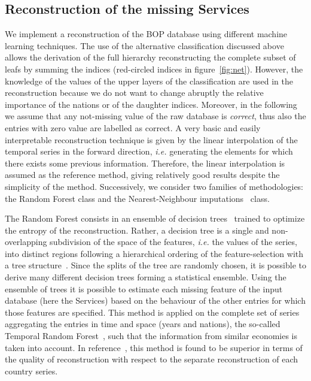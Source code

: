 \documentclass[fleqn,10pt]{article}
\begin{document}
\subsection*{Reconstruction of the missing Services}

We implement a reconstruction of the BOP database using different machine learning techniques.
The use of the alternative classification discussed above allows the derivation of the full hierarchy reconstructing the complete subset of leafs by summing the indices (red-circled indices in figure~\ref{fig:net}).
However, the knowledge of the values of the upper layers of the classification are used in the reconstruction because we do not want to change abruptly the relative importance of the nations or of the daughter indices.
Moreover, in the following we assume that any not-missing value of the raw database is \textit{correct}, thus also the entries with zero value are labelled as correct.
A very basic and easily interpretable reconstruction technique is given by the linear interpolation of the temporal series in the forward direction, \textit{i.e.} generating the elements for which there exists some previous information.
Therefore, the linear interpolation is assumed as the reference method, giving relatively good results despite the simplicity of the method.
Successively, we consider two families of methodologies: the Random Forest class and the Nearest-Neighbour imputations~\cite{batista2002study} class.


The Random Forest consists in an ensemble of decision trees~\cite{Breiman2001} trained to optimize the entropy of the reconstruction.
Rather, a decision tree is a single and non-overlapping subdivision of the space of the features, \textit{i.e.} the values of the series, into distinct regions following a hierarchical ordering of the feature-selection with a tree structure~\cite{Safavian1991}.
Since the splits of the tree are randomly chosen, it is possible to derive many different decision trees forming a statistical ensemble.
Using the ensemble of trees it is possible to estimate each missing feature of the input database (here the Services) based on the behaviour of the other entries for which those features are specified.
This method is applied on the complete set of series aggregating the entries in time and space (years and nations), the so-called Temporal Random Forest~\cite{Serafini}, such that the information from similar economies is taken into account.
In reference~\cite{Serafini}, this method is found to be superior in terms of the quality of reconstruction with respect to the separate reconstruction of each country series.
\end{document}

